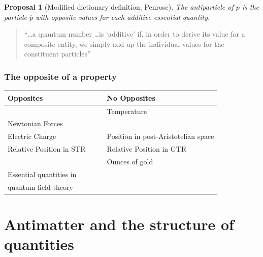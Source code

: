 \documentclass{beamer}
\def\ol{\overline}
\newtheorem{prop}{Proposal}
\begin{document}
\begin{frame}
  \begin{prop}[Modified dictionary definition; Penrose] The
    antiparticle of $p$ is the particle $\ol p$ with \emph{opposite}
    values for each \emph{additive} essential quantity. \end{prop}

\bigskip \pause

\begin{quote}``\ldots a quantum number \dots is `additive' if, in
  order to derive its value for a composite entity, we simply add up
  the individual values for the constituent particles'' \end{quote}

\end{frame}






\begin{frame}
  \frametitle{The opposite of a property}

  \bigskip \bigskip

\begin{center}
\begin{tabular}{ll|ll}
  Opposites  & & & No Opposites \\
  \hline 
   & & & Temperature \\
  Newtonian Forces & & &   \\
  Electric Charge & & &  Position in post-Aristotelian space \\
  Relative Position in STR &&& Relative Position in GTR  \\
  &&& Ounces of gold     \\
  Essential quantities in &&& \\ 
  quantum field theory \end{tabular}
\end{center}
\end{frame}




\section{Antimatter and the structure of quantities}
\end{document}
